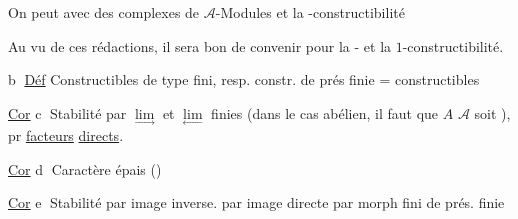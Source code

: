On peut  avec des complexes de $\mathcal A$-Modules et la -constructibilité

Au vu de ces rédactions, il sera bon de convenir pour la - et la $1$-constructibilité.

\textcircled{b} \uline{Déf} Constructibles de type fini, resp. constr. de prés finie = constructibles


\uline{Cor} \textcircled{c} Stabilité par $\underset{\longrightarrow}{\lim}$ et $\underset{\longleftarrow}{\lim}$ finies (dans le cas abélien, il faut  que $A$  $\mathcal A$ soit ), pr \uline{facteurs} \uline{directs}.

\uline{Cor} \textcircled{d} Caractère épais ()

\uline{Cor} \textcircled{e} Stabilité par image inverse. par image directe par morph fini de prés. finie  

